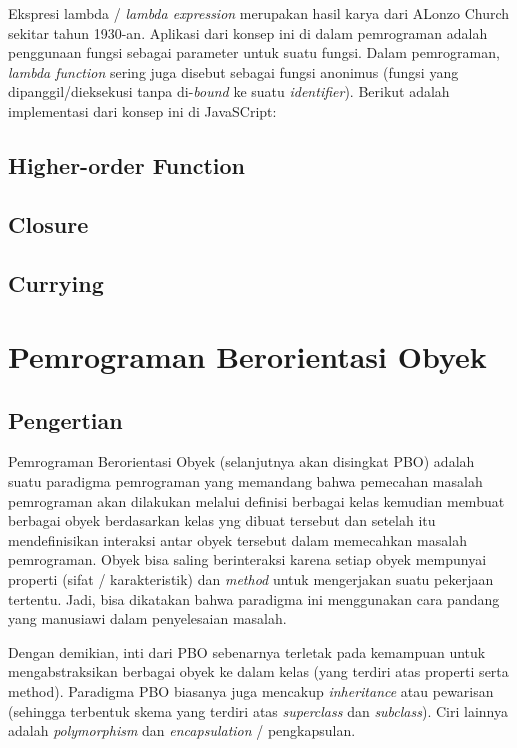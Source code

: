 Ekspresi lambda / \textit{lambda expression} merupakan hasil karya dari ALonzo Church sekitar tahun 1930-an. Aplikasi dari konsep ini di dalam pemrograman adalah penggunaan fungsi sebagai parameter untuk suatu fungsi. Dalam pemrograman, \textit{lambda function} sering juga disebut sebagai fungsi anonimus (fungsi yang dipanggil/dieksekusi tanpa di-\textit{bound} ke suatu \textit{identifier}). Berikut adalah implementasi dari konsep ini di JavaSCript:




\subsection{Higher-order Function}

\subsection{Closure}

\subsection{Currying}


\section{Pemrograman Berorientasi Obyek}

\subsection{Pengertian}

Pemrograman Berorientasi Obyek (selanjutnya akan disingkat PBO) adalah suatu paradigma pemrograman yang memandang bahwa pemecahan masalah pemrograman akan dilakukan melalui definisi berbagai kelas kemudian membuat berbagai obyek berdasarkan kelas yng dibuat tersebut dan setelah itu mendefinisikan interaksi antar obyek tersebut dalam memecahkan masalah pemrograman. Obyek bisa saling berinteraksi karena setiap obyek mempunyai properti (sifat / karakteristik) dan \textit{method} untuk mengerjakan suatu pekerjaan tertentu. Jadi, bisa dikatakan bahwa paradigma ini menggunakan cara pandang yang manusiawi dalam penyelesaian masalah.

Dengan demikian, inti dari PBO sebenarnya terletak pada kemampuan untuk mengabstraksikan berbagai obyek ke dalam kelas (yang terdiri atas properti serta method). Paradigma PBO biasanya juga mencakup \textit{inheritance} atau pewarisan (sehingga terbentuk skema yang terdiri atas \textit{superclass} dan \textit{subclass}). Ciri lainnya adalah \textit{polymorphism} dan \textit{encapsulation} / pengkapsulan.

